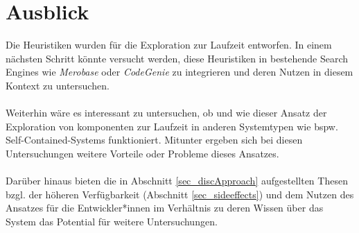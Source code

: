 \section{Ausblick}
Die \Gls{Heuristik}en wurden für die Exploration zur Laufzeit entworfen. In einem nächsten Schritt könnte versucht werden, diese \gls{Heuristik}en in bestehende Search \Gls{Engine}s wie \emph{Merobase} oder \emph{CodeGenie} zu integrieren und deren Nutzen in diesem Kontext zu untersuchen.
\\\\
Weiterhin wäre es interessant zu untersuchen, ob und wie dieser Ansatz der Exploration von \Gls{komponente}n zur Laufzeit in anderen Systemtypen wie bspw. Self-Contained-Systems funktioniert. Mitunter ergeben sich bei diesen Untersuchungen weitere Vorteile oder Probleme dieses Ansatzes.
\\\\
Darüber hinaus bieten die in Abschnitt \ref{sec_discApproach} aufgestellten Thesen bzgl. der höheren Verfügbarkeit (Abschnitt \ref{sec_sideeffects}) und dem Nutzen des Ansatzes für die Entwickler*innen im Verhältnis zu deren Wissen über das System das Potential für weitere Untersuchungen.
